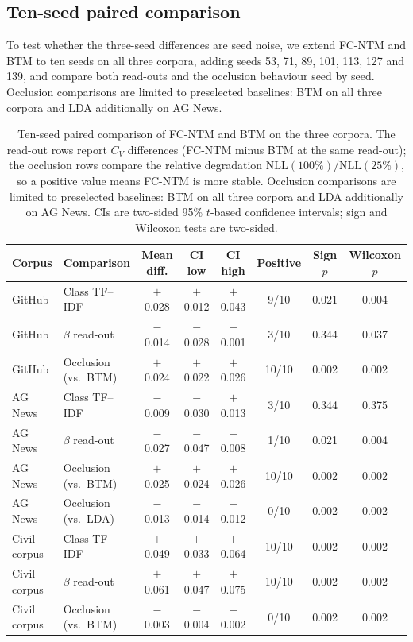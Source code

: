 \documentclass[pdflatex,sn-basic]{sn-jnl}
\newcommand{\fcntm}{FC-NTM}
\begin{document}
\subsection{Ten-seed paired comparison}
To test whether the three-seed differences are seed noise, we extend \fcntm{} and BTM to ten
seeds on all three corpora, adding seeds 53, 71, 89, 101, 113, 127 and 139, and compare both
read-outs and the occlusion behaviour seed by seed. Occlusion comparisons are limited to preselected baselines:
BTM on all three corpora and LDA additionally on AG News.

\begin{table}[!t]
\centering
\caption{Ten-seed paired comparison of \fcntm{} and BTM on the three corpora. The read-out rows
report $C_V$ differences (\fcntm{} minus BTM at the same read-out); the occlusion rows compare
the relative degradation $\mathrm{NLL}(100\%)/\mathrm{NLL}(25\%)$, so a positive value means
\fcntm{} is more stable. Occlusion comparisons are limited to preselected baselines: BTM on all
three corpora and LDA additionally on AG News. CIs are two-sided 95\% $t$-based confidence
intervals; sign and Wilcoxon tests are two-sided.}
\label{tab:seed-paired}
\footnotesize
\setlength{\tabcolsep}{4pt}
\begin{tabular}{@{}llcccccc@{}}
\toprule
Corpus & Comparison & Mean diff. & CI low & CI high & Positive & Sign $p$ & Wilcoxon $p$ \\
\midrule
GitHub & Class TF--IDF & $+$0.028 & $+$0.012 & $+$0.043 & 9/10 & 0.021 & 0.004 \\
GitHub & $\beta$ read-out & $-$0.014 & $-$0.028 & $-$0.001 & 3/10 & 0.344 & 0.037 \\
GitHub & Occlusion (vs.\ BTM) & $+$0.024 & $+$0.022 & $+$0.026 & 10/10 & 0.002 & 0.002 \\
\midrule
AG News & Class TF--IDF & $-$0.009 & $-$0.030 & $+$0.013 & 3/10 & 0.344 & 0.375 \\
AG News & $\beta$ read-out & $-$0.027 & $-$0.047 & $-$0.008 & 1/10 & 0.021 & 0.004 \\
AG News & Occlusion (vs.\ BTM) & $+$0.025 & $+$0.024 & $+$0.026 & 10/10 & 0.002 & 0.002 \\
AG News & Occlusion (vs.\ LDA) & $-$0.013 & $-$0.014 & $-$0.012 & 0/10 & 0.002 & 0.002 \\
\midrule
Civil corpus & Class TF--IDF & $+$0.049 & $+$0.033 & $+$0.064 & 10/10 & 0.002 & 0.002 \\
Civil corpus & $\beta$ read-out & $+$0.061 & $+$0.047 & $+$0.075 & 10/10 & 0.002 & 0.002 \\
Civil corpus & Occlusion (vs.\ BTM) & $-$0.003 & $-$0.004 & $-$0.002 & 0/10 & 0.002 & 0.002 \\
\bottomrule
\end{tabular}
\end{table}
\end{document}
